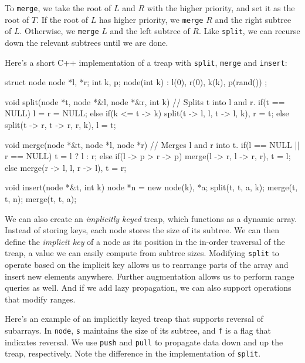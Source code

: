 To \texttt{merge}, we take the root of $L$ and $R$ with the higher priority, and set it as the root of $T$. If the root of $L$ has higher priority, we \texttt{merge} $R$ and the right subtree of $L$. Otherwise, we \texttt{merge} $L$ and the left subtree of $R$. Like \texttt{split}, we can recurse down the relevant subtrees until we are done.

Here's a short C++ implementation of a treap with \texttt{split}, \texttt{merge} and \texttt{insert}:

\begin{mylstlisting}[language=C++]
struct node {
  node *l, *r;
  int k, p;
  node(int k) : l(0), r(0), k(k), p(rand()) {}
};

void split(node *t, node *&l, node *&r, int k){
  // Splits t into l and r.
  if(t == NULL) l = r = NULL;
  else if(k <= t -> k) split(t -> l, l, t -> l, k), r = t;
  else split(t -> r, t -> r, r, k), l = t;
}

void merge(node *&t, node *l, node *r){
  // Merges l and r into t.
  if(l == NULL || r == NULL) t = l ? l : r;
  else if(l -> p > r -> p) merge(l -> r, l -> r, r), t = l;
  else merge(r -> l, l, r -> l), t = r;
}

void insert(node *&t, int k){
  node *n = new node(k), *a;
  split(t, t, a, k);
  merge(t, t, n);
  merge(t, t, a);
}
\end{mylstlisting}

We can also create an \emph{implicitly keyed} treap, which functions as a dynamic array. Instead of storing keys, each node stores the size of its subtree. We can then define the \emph{implicit key} of a node as its position in the in-order traversal of the treap, a value we can easily compute from subtree sizes. Modifying \texttt{split} to operate based on the implicit key allows us to rearrange parts of the array and insert new elements anywhere. Further augmentation allows us to perform range queries as well. And if we add lazy propagation, we can also support operations that modify ranges.

Here's an example of an implicitly keyed treap that supports reversal of subarrays. In \texttt{node}, \texttt{s} maintains the size of its subtree, and \texttt{f} is a flag that indicates reversal. We use \texttt{push} and \texttt{pull} to propagate data down and up the treap, respectively. Note the difference in the implementation of \texttt{split}.

